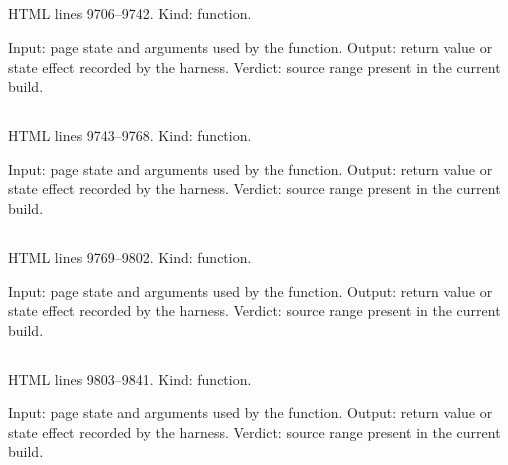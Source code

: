 \subsection*{\texttt{}}
\label{vf_534_renderReviewStatistics}
HTML lines 9706--9742. Kind: function.

Input: page state and arguments used by the function.
Output: return value or state effect recorded by the harness.
Verdict: source range present in the current build.

\subsection*{\texttt{}}
\label{vf_535_renderReviewControls}
HTML lines 9743--9768. Kind: function.

Input: page state and arguments used by the function.
Output: return value or state effect recorded by the harness.
Verdict: source range present in the current build.

\subsection*{\texttt{}}
\label{vf_536_drawLeveyJennings}
HTML lines 9769--9802. Kind: function.

Input: page state and arguments used by the function.
Output: return value or state effect recorded by the harness.
Verdict: source range present in the current build.

\subsection*{\texttt{}}
\label{vf_537_renderReviewRuns}
HTML lines 9803--9841. Kind: function.

Input: page state and arguments used by the function.
Output: return value or state effect recorded by the harness.
Verdict: source range present in the current build.

